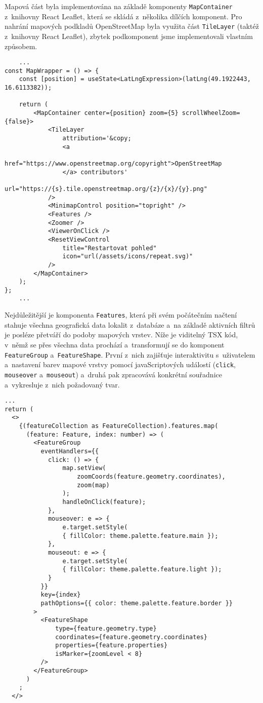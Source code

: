 Mapová část byla implementována na základě komponenty \verb|MapContainer| z~knihovny React Leaflet, která se skládá z~několika dílčích komponent. Pro nahrání mapových podkladů OpenStreetMap byla využita část \verb|TileLayer| (taktéž z~knihovny React Leaflet), zbytek podkomponent jsme implementovali vlastním způsobem.

\begin{verbatim}
    ...
const MapWrapper = () => {
    const [position] = useState<LatLngExpression>(latLng(49.1922443, 16.6113382));

    return (
        <MapContainer center={position} zoom={5} scrollWheelZoom={false}>
            <TileLayer
                attribution='&copy;
                <a
                href="https://www.openstreetmap.org/copyright">OpenStreetMap
                </a> contributors'
                url="https://{s}.tile.openstreetmap.org/{z}/{x}/{y}.png"
            />
            <MinimapControl position="topright" />
            <Features />
            <Zoomer />
            <ViewerOnClick />
            <ResetViewControl
                title="Restartovat pohled"
                icon="url(/assets/icons/repeat.svg)"
            />
        </MapContainer>
    );
};
    ...
    \end{verbatim}

Nejdůležitější je komponenta \verb|Features|, která při svém počátečním načtení stahuje všechna geografická data lokalit z~databáze a~na základě aktivních filtrů je posléze přetváří do podoby mapových vrstev. Níže je viditelný TSX kód, v~němž se přes všechna data prochází a~transformují se do komponent \verb|FeatureGroup| a~\verb|FeatureShape|. První z~nich zajišťuje interaktivitu s~uživatelem a~nastavení barev mapové vrstvy pomocí javaScriptových událostí (\verb|click|, \verb|mouseover| a~\verb|mouseout|) a~druhá pak zpracovává konkrétní souřadnice a~vykresluje z~nich požadovaný tvar.

\begin{verbatim}
...
return (
  <>
    {(featureCollection as FeatureCollection).features.map(
      (feature: Feature, index: number) => (
        <FeatureGroup
          eventHandlers={{
            click: () => {
                map.setView(
                    zoomCoords(feature.geometry.coordinates),
                    zoom(map)
                );
                handleOnClick(feature);
            },
            mouseover: e => {
                e.target.setStyle(
                { fillColor: theme.palette.feature.main });
            },
            mouseout: e => {
                e.target.setStyle(
                { fillColor: theme.palette.feature.light });
            }
          }}
          key={index}
          pathOptions={{ color: theme.palette.feature.border }}
        >
          <FeatureShape
              type={feature.geometry.type}
              coordinates={feature.geometry.coordinates}
              properties={feature.properties}
              isMarker={zoomLevel < 8}
          />
        </FeatureGroup>
      )
    ;
  </>
\end{verbatim}
